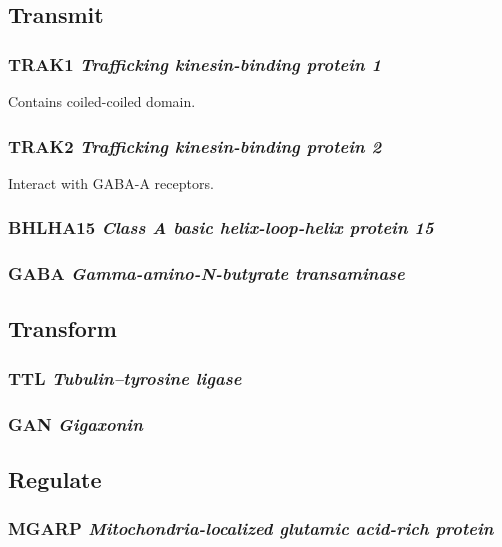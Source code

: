 \subsection{Transmit}

\subsubsection{TRAK1 \textit{Trafficking kinesin-binding protein 1}}

Contains coiled-coiled domain.

\subsubsection{TRAK2 \textit{Trafficking kinesin-binding protein 2}}

Interact with GABA-A receptors.

\subsubsection{BHLHA15 \textit{Class A basic helix-loop-helix protein 15}}

\subsubsection{GABA \textit{Gamma-amino-N-butyrate transaminase}}

\subsection{Transform}

\subsubsection{TTL \textit{Tubulin--tyrosine ligase}}

\subsubsection{GAN \textit{Gigaxonin}}

\subsection{Regulate}

\subsubsection{MGARP \textit{Mitochondria-localized glutamic acid-rich protein}}

